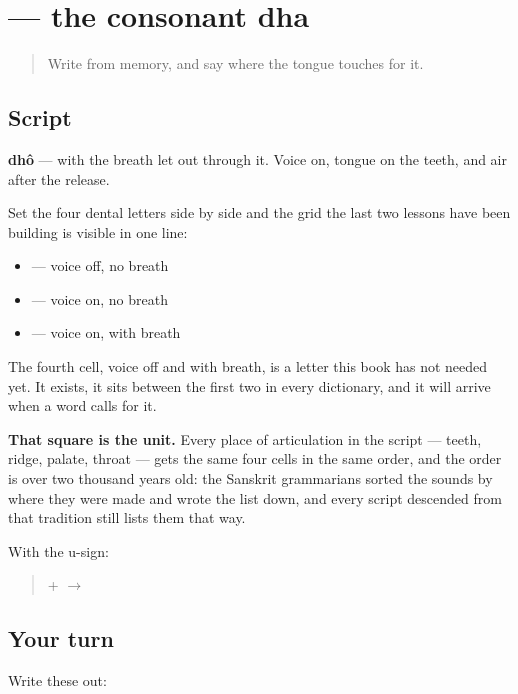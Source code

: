\section[\texorpdfstring{\bn{ধ} (dhô)}{ধ (dhô)}]{ — the consonant dha}

\label{lesson:BN-W03-dha}



\begin{quote}
Write \textbf{} from memory, and say where the tongue touches for it.
\end{quote}

\subsection*{Script}
\begin{quote}
\end{quote}

\textbf{dhô} — \textbf{} with the breath let out through it. Voice on, tongue on the teeth, and air after the release.

Set the four dental letters side by side and the grid the last two lessons have been building is visible in one line:

\begin{itemize}
\raggedright
  \item \textbf{} — voice off, no breath
  \item \textbf{} — voice on, no breath
  \item \textbf{} — voice on, with breath
\end{itemize}

The fourth cell, voice off and with breath, is a letter this book has not needed yet. It exists, it sits between the first two in every dictionary, and it will arrive when a word calls for it.

\textbf{That square is the unit.} Every place of articulation in the script — teeth, ridge, palate, throat — gets the same four cells in the same order, and the order is over two thousand years old: the Sanskrit grammarians sorted the sounds by where they were made and wrote the list down, and every script descended from that tradition still lists them that way.

With the u-sign:

\begin{quote}
\textbf{} + \textbf{} $\to$ \textbf{}
\end{quote}

\subsection*{Your turn}
Write these out:

